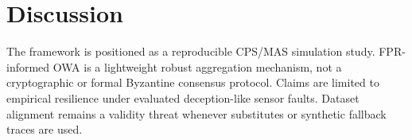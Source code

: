 \section{Discussion}
The framework is positioned as a reproducible CPS/MAS simulation study. FPR-informed OWA is a lightweight robust aggregation mechanism, not a cryptographic or formal Byzantine consensus protocol. Claims are limited to empirical resilience under evaluated deception-like sensor faults. Dataset alignment remains a validity threat whenever substitutes or synthetic fallback traces are used.

